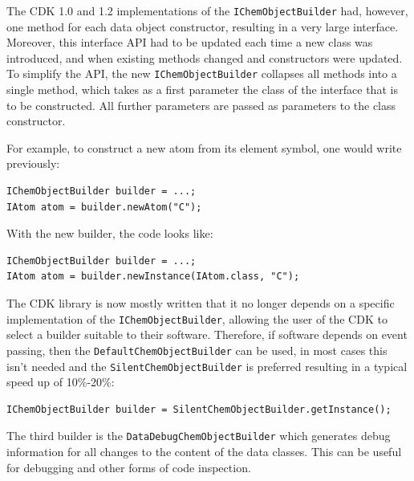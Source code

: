 \documentclass[10pt]{bmcart}
\begin{document}
The CDK 1.0 and 1.2 implementations of the \texttt{IChemObjectBuilder} had,
however, one method for each data object constructor, resulting in a very large
interface. Moreover, this interface API had to be updated each time a new class
was introduced, and when existing methods changed and constructors were updated.
To simplify the API, the new \texttt{IChemObjectBuilder} collapses all methods
into a single method, which takes as a first parameter the class of the
interface that is to be constructed. All further parameters are passed as
parameters to the class constructor.

For example, to construct a new atom from its element symbol, one
would write previously:

\vspace{0.2cm}
\begin{verbatim}
IChemObjectBuilder builder = ...;
IAtom atom = builder.newAtom("C");
\end{verbatim}
\vspace{0.2cm}

With the new builder, the code looks like:

\vspace{0.2cm}
\begin{verbatim}
IChemObjectBuilder builder = ...;
IAtom atom = builder.newInstance(IAtom.class, "C");
\end{verbatim}
\vspace{0.2cm}

The CDK library is now mostly written that it no longer depends on a specific
implementation of the \texttt{IChemObjectBuilder}, allowing the user of the
CDK to select a builder suitable to their software. Therefore, if software
depends on event passing, then the \texttt{DefaultChemObjectBuilder} can be
used, in most cases this isn't needed and the \texttt{SilentChemObjectBuilder} 
is preferred resulting in a typical speed up of 10\%-20\%:

\vspace{0.2cm}
\begin{verbatim}
IChemObjectBuilder builder = SilentChemObjectBuilder.getInstance();
\end{verbatim}
\vspace{0.2cm}

The third builder is the \texttt{DataDebugChemObjectBuilder} which generates debug
information for all changes to the content of the data classes. This
can be useful for debugging and other forms of code inspection.
\end{document}
